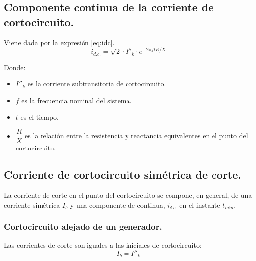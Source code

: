         \subsection{Componente continua de la corriente de cortocircuito.}
            Viene dada por la expresión \eqref{eq:idc}.
            \begin{equation}\label{eq:idc}
                i_\textit{d.c.} = \sqrt{2}\cdot I''_\textit{k}\cdot e^{-2\pi f t R/X}
            \end{equation}

            Donde:
            \begin{itemize}
                \item $I''_\textit{k}$ es la corriente subtransitoria de cortocircuito.
                \item $f$ es la frecuencia nominal del sistema.
                \item $t$ es el tiempo.
                \item $\dfrac{R}{X}$ es la relación entre la resistencia y reactancia equivalentes en el punto del cortocircuito.
            \end{itemize}

        \subsection{Corriente de cortocircuito simétrica de corte.}
            La corriente de corte en el punto del cortocircuito se compone, en general, de una corriente simétrica $I_\textit{b}$ y una componente de continua, $i_\textit{d.c.}$ en el instante $t_\textit{mín}$.
            \subsubsection{Cortocircuito alejado de un generador.}
                Las corrientes de corte son iguales a las iniciales de cortocircuito:
                \begin{equation}
                    I_\textit{b} = I''_\textit{k}
                \end{equation}
            
